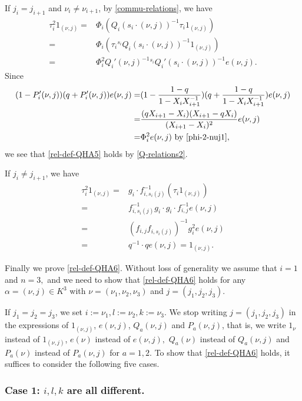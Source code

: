 \documentclass[11pt, reqno]{amsart} \textwidth=14.9cm \oddsidemargin=1cm \evensidemargin=1cm
\theoremstyle{definition}
\numberwithin{equation}{section}
\begin{document}
If $j_{i}=j_{i+1}$ and $\nu_{i}\neq \nu_{i+1}$, by \eqref{commu-relations}, we have
\begin{align*}
\tau_{i}^{2}1_{(\nu, j)}=&\Phi_{i}(Q_{i}(s_{i}\cdot(\nu, j))^{-1}\tau_{i}1_{(\nu, j)})\\
=&\Phi_{i}(\tau_{i}{}^{s_{i}}Q_{i}(s_{i}\cdot(\nu, j))^{-1}1_{(\nu, j)})\\
=&\Phi_{i}^{2}Q_{i}'(\nu, j)^{-1}{}^{s_{i}}Q_{i}'(s_{i}\cdot(\nu, j))^{-1}e(\nu, j).
\end{align*}
Since
\begin{align}
(1-P_{i}'(\nu, j))(q+P_{i}'(\nu, j))e(\nu, j)=&(1-\frac{1-q}{1-X_{i}X_{i+1}^{-1}})(q+\frac{1-q}{1-X_{i}X_{i+1}^{-1}})e(\nu, j)\notag\\
=&\frac{(qX_{i+1}-X_{i})(X_{i+1}-qX_i)}{(X_{i+1}-X_{i})^{2}}e(\nu, j)\label{p-ralation}\\
=&\Phi_{i}^{2}e(\nu, j)\text{ by }\eqref{phi-2-nuj1}\notag,
\end{align}
we see that \eqref{rel-def-QHA5} holds by \eqref{Q-relations2}.

If $j_{i}\neq j_{i+1}$, we have
\begin{align*}
\tau_{i}^{2}1_{(\nu, j)}=&g_{i}\cdot f_{i, s_{i}(j)}^{-1}(\tau_{i}1_{(\nu, j)})\\
=&f_{i, s_{i}(j)}^{-1}g_{i}\cdot g_{i}\cdot f_{i, j}^{-1}e(\nu, j)\\
=&(f_{i, j}f_{i, s_{i}(j)})^{-1}g_{i}^{2}e(\nu, j)\\
=&q^{-1}\cdot qe(\nu, j)=1_{(\nu, j)}.
\end{align*}

Finally we prove \eqref{rel-def-QHA6}. Without loss of generality we assume that $i=1$ and $n=3,$ and we need to show that \eqref{rel-def-QHA6} holds for any $\alpha=(\nu, j)\in K^{3}$ with $\nu=(\nu_1, \nu_2, \nu_3)$ and $j=(j_1, j_2, j_3).$

If $j_1=j_2=j_3$, we set $i:=\nu_1, l:=\nu_2, k:=\nu_3.$ We stop writing $j=(j_1, j_2, j_3)$ in the expressions of $1_{(\nu, j)}$, $e(\nu, j)$, $Q_{a}(\nu, j)$ and $P_{a}(\nu, j)$, that is, we write $1_{\nu}$ instead of $1_{(\nu, j)}$, $e(\nu)$ instead of $e(\nu, j),$ $Q_{a}(\nu)$ instead of $Q_{a}(\nu, j)$ and $P_{a}(\nu)$ instead of $P_{a}(\nu, j)$ for $a=1,2.$ To show that \eqref{rel-def-QHA6} holds, it suffices to consider the following five cases.

\subsubsection*{Case 1: $i, l, k$ are all different.}
\end{document}
